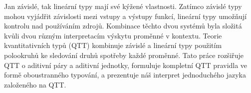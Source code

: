 \documentclass[12pt]{report}
\def\Abstract{%
Jan závislé, tak lineární typy mají své kýžené vlastnosti. Zatímco závislé typy
mohou vyjádřit závislosti mezi vstupy a výstupy funkcí, lineární typy umožňují
kontrolu nad používáním zdrojů. Kombinace těchto dvou systémů byla složitá kvůli
dvou různým interpretacím výskytu proměnné v kontextu. Teorie kvantitativních
typů (QTT) kombinuje závislé a lineární typy použitím polookruhů ke sledování
druhů spotřeby každé proměnné. Tato práce rozšiřuje QTT o aditivní páry a
aditivní jednotky, formuluje kompletní QTT pravidla ve formě oboustranného
typování, a prezentuje náš interpret jednoduchého jazyka založeného na QTT.
}
\begin{document}
\Abstract
\end{document}
